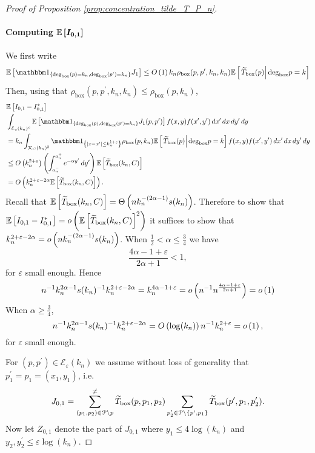 \begin{proof}[Proof of Proposition \ref{prop:concentration_tilde_T_P_n}]
\paragraph{Computing $\bm{\mathbb{E}\left[I_{0,1}\right]}$}

We first write
\begin{equation}\label{eq:bound_E_J1}
	\Exp{\ind{\Dbox(p) = k_n, \Dbox(p^\prime) = k_n} J_1}
	\le \bigO{1} k_n \rho_{\text{box}}(p,p^\prime,k_n,k_n)\CExp{\widetilde{T}_{\text{box}}(p)}{\Dbox{p} = k}
\end{equation}
Then, using that $\rho_{\text{box}}(p,p^\prime,k_n,k_n) \le \rho_{\text{box}}(p,k_n)$,
\begin{align*}
	&\Exp{I_{0,1} - I_{0,1}^\ast}\\
	&\int_{\mathcal{E}_\varepsilon(k_n)^c}
		\Exp{\ind{\Dbox(p), \Dbox(p^\prime) = k_n} J_1(p,p^\prime)} f(x,y) f(x^\prime,y^\prime) \, dx^\prime \, dx \, dy^\prime \, dy\\
	&= k_n \int_{\Kcal_C(k_n)^2} \ind{|x-x^\prime| \le k_n^{1 + \varepsilon}}
		\rho_{\text{box}}(p,k_n)\CExp{\widetilde{T}_{\text{box}}(p)}{\Dbox{p} = k} f(x,y) f(x^\prime,y^\prime) \, dx^\prime \, dx \, dy^\prime \, dy\\
	&\le \bigO{k_n^{2+\varepsilon}} \left(\int_{a_n^-}^{a_n^+} e^{-\alpha y^\prime} \, dy^\prime\right) 
		\Exp{\widetilde{T}_{\text{box}}(k_n,C)}\\
	&= \bigO{k_n^{2 + \varepsilon - 2\alpha} \Exp{\widetilde{T}_{\text{box}}(k_n,C)}}.
\end{align*}
Recall that $\mathbb{E}\left[\widetilde{T}_{\text{box}}(k_n,C)\right] = \Theta\left(n k_n^{-(2\alpha - 1)}s(k_n)\right)$. Therefore to show that $\mathbb{E}\left[I_{0,1} - I_{0,1}^\ast\right] = o\left(\mathbb{E}\left[\widetilde{T}_{\text{box}}(k_n,C)\right]^2\right)$ it suffices to show that $k_n^{2 + \varepsilon - 2\alpha} = o\left(n k_n^{-(2\alpha - 1)}s(k_n)\right)$. When $\frac{1}{2} < \alpha \le \frac{3}{4}$ we have
\[
	\frac{4\alpha - 1 + \varepsilon}{2\alpha + 1} < 1,
\]
for $\varepsilon$ small enough. Hence
\[
	n^{-1} k_n^{2\alpha - 1} s(k_n)^{-1} k_n^{2 + \varepsilon -2\alpha} = k_n^{4\alpha - 1 + \varepsilon} 
	= o\left(n^{-1}n^{\frac{4\alpha - 1 + \varepsilon}{2\alpha + 1}}\right) = o\left(1\right)
\]
When $\alpha \ge \frac{3}{4}$,
\[
	n^{-1} k_n^{2\alpha - 1} s(k_n)^{-1} k_n^{2 + \varepsilon -2\alpha} = O\left(\log(k_n)\right) n^{-1} k_n^{2 + \varepsilon} = o\left(1\right),
\]
for $\varepsilon$ small enough.

For $(p,p^\prime) \in \mathcal{E}_\varepsilon(k_n)$ we assume without loss of generality that $p_1^\prime = p_1 = (x_1,y_1)$, i.e.
\[
	J_{0,1} = \sum_{(p_1, p_2) \in {\mathcal P} \setminus p}^{\ne} \widetilde{T}_{\text{box}}(p,p_1,p_2) 
	\sum_{p_2^\prime \in {\mathcal P} \setminus \{p^\prime, p_1\}} \widetilde{T}_{\text{box}}(p^\prime,p_1,p_2^\prime). 
\] 
Now let $Z_{0,1}$ denote the part of $J_{0,1}$ where $y_1 \le 4\log(k_n)$ and $y_2, y_2^\prime \le \varepsilon \log(k_n)$. 


\end{proof}
